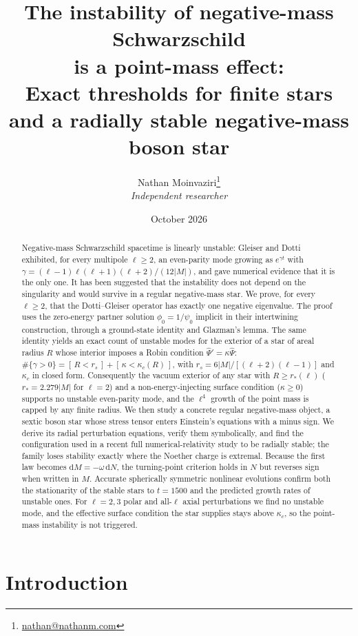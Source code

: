 \documentclass[11pt]{article}
\title{The instability of negative-mass Schwarzschild\\is a point-mass effect:\\[4pt]
\large Exact thresholds for finite stars and a radially stable negative-mass boson star}
\author{Nathan Moinvaziri\thanks{\href{mailto:nathan@nathanm.com}{nathan@nathanm.com}}\\[2pt]
\normalsize\textit{Independent researcher}}
\date{October 2026}
\theoremstyle{remark}
\newcommand{\dd}{\mathrm{d}}
\newcommand{\Ind}[1]{[\,#1\,]}
\begin{document}
\maketitle

\begin{abstract}
Negative-mass Schwarzschild spacetime is linearly unstable: Gleiser and Dotti exhibited, for every multipole
$\ell\ge2$, an even-parity mode growing as $e^{\gamma t}$ with $\gamma=(\ell-1)\ell(\ell+1)(\ell+2)/(12|M|)$, and
gave numerical evidence that it is the only one. It has been suggested that the instability does not depend on the
singularity and would survive in a regular negative-mass star. We prove, for every $\ell\ge2$, that the
Dotti--Gleiser operator has exactly one negative eigenvalue. The proof uses the zero-energy partner solution
$\phi_0=1/\psi_0$ implicit in their intertwining construction, through a ground-state identity and Glazman's lemma.
The same identity yields an exact count of unstable modes for the exterior of a star of areal radius $R$ whose
interior imposes a Robin condition $\hat\Psi'=\kappa\hat\Psi$:
$\#\{\gamma>0\}=\Ind{R<r_s}+\Ind{\kappa<\kappa_c(R)}$, with $r_s=6|M|/[(\ell+2)(\ell-1)]$ and $\kappa_c$ in closed form.
Consequently the vacuum exterior of any star with $R\ge r_*(\ell)$ ($r_*=2.279|M|$ for $\ell=2$) and a
non-energy-injecting surface condition ($\kappa\ge0$) supports no unstable even-parity mode, and the $\ell^4$ growth
of the point mass is capped by any finite radius. We then study a concrete regular negative-mass object, a sextic boson star whose stress tensor enters
Einstein's equations with a minus sign. We derive its radial perturbation equations, verify them symbolically, and
find the configuration used in a recent full numerical-relativity study to be radially stable; the family loses
stability exactly where the Noether charge is extremal. Because the first law becomes $\dd M=-\omega\,\dd N$, the
turning-point criterion holds in $N$ but reverses sign when written in $M$. Accurate spherically symmetric nonlinear
evolutions confirm both the stationarity of the stable stars to $t=1500$ and the predicted growth rates of unstable ones.
For $\ell=2,3$ polar and all-$\ell$ axial perturbations we find no unstable mode, and the effective surface condition the
star supplies stays above $\kappa_c$, so the point-mass instability is not triggered.
\end{abstract}

\section{Introduction}
\end{document}
